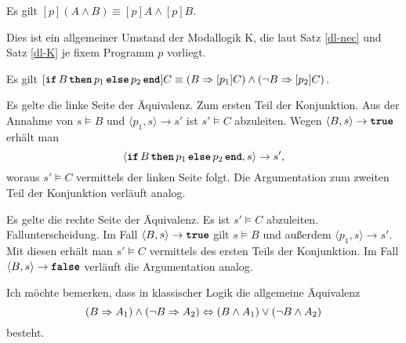 \begin{Satz}
Es gilt $[p](A\land B)\equiv [p]A\land [p]B$.
\end{Satz}
\begin{Beweis}
Dies ist ein allgemeiner Umstand der Modallogik K, die
laut Satz \ref{dl-nec} und Satz \ref{dl-K} je fixem Programm $p$
vorliegt.\,\qedsymbol
\end{Beweis}

\begin{Satz}
Es gilt $[\kw{if}\,B\,\kw{then}\,p_1\,\kw{else}\,p_2\,\kw{end}]C\equiv
(B\cond [p_1]C)\land (\lnot B\cond [p_2]C)$.
\end{Satz}
\begin{Beweis}
Es gelte die linke Seite der Äquivalenz. Zum ersten Teil der Konjunktion.
Aus der Annahme von $s\models B$ und $\langle p_1,s\rangle\to s'$ ist
$s'\models C$ abzuleiten. Wegen $\langle B,s\rangle\to\kw{true}$ erhält man
\[\langle\kw{if}\,B\,\kw{then}\,p_1\,\kw{else}\,p_2\,\kw{end},s\rangle\to s',\]
woraus $s'\models C$ vermittels der linken Seite folgt. Die Argumentation
zum zweiten Teil der Konjunktion verläuft analog.

Es gelte die rechte Seite der Äquivalenz. Es ist $s'\models C$
abzuleiten. Fallunterscheidung. Im Fall $\langle B,s\rangle\to\kw{true}$
gilt $s\models B$ und außerdem $\langle p_1,s\rangle\to s'$. Mit
diesen erhält man $s'\models C$ vermittels des ersten Teils der
Konjunktion. Im Fall $\langle B,s\rangle\to\kw{false}$ verläuft
die Argumentation analog.\,\qedsymbol
\end{Beweis}

\noindent
Ich möchte bemerken, dass in klassischer Logik die allgemeine Äquivalenz
\[(B\Rightarrow A_1)\land (\lnot B\Rightarrow A_2)\Leftrightarrow
(B\land A_1)\lor (\lnot B\land A_2)\]
besteht.
